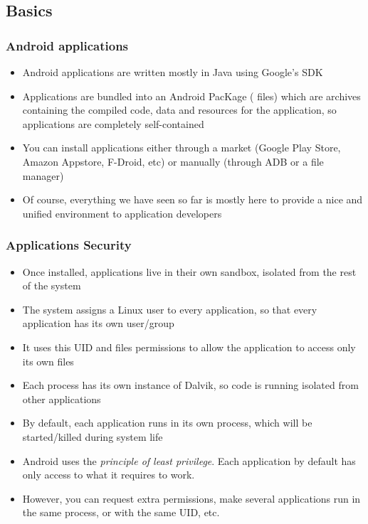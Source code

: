 \subsection{Basics}
\begin{frame}
  \frametitle{Android applications}
  \begin{itemize}
  \item Android applications are written mostly in Java using Google's
    SDK
  \item Applications are bundled into an Android PacKage (
    files) which are archives containing the compiled code, data and resources for the
    application, so applications are completely self-contained
  \item You can install applications either through a market (Google
    Play Store, Amazon Appstore, F-Droid, etc) or manually (through
    ADB or a file manager)
  \item Of course, everything we have seen so far is mostly here to
    provide a nice and unified environment to application developers
  \end{itemize}
\end{frame}

\begin{frame}
  \frametitle{Applications Security}
  \begin{itemize}
  \item Once installed, applications live in their own sandbox,
    isolated from the rest of the system
  \item The system assigns a Linux user to every application, so that
    every application has its own user/group
  \item It uses this UID and files permissions to allow  the application
    to access only its own files 
  \item Each process has its own instance of Dalvik, so code is
    running isolated from other applications
  \item By default, each application runs in its own process, which
    will be started/killed during system life
  \item Android uses the \emph{principle of least privilege}. Each
    application by default has only access to what it requires to work.
  \item However, you can request extra permissions, make several
    applications run in the same process, or with the same UID, etc.
  \end{itemize}
\end{frame}

